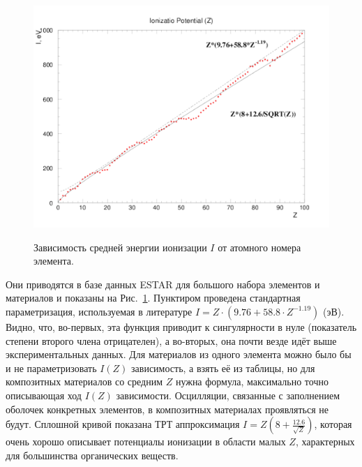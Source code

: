 \documentclass[a4paper,12pt]{article}
\begin{document}
\begin{large}
  \begin{figure}[ht]
    {
       \includegraphics[width=0.99\linewidth]{images/iofz}
    }
    \caption{Зависимость средней энергии ионизации $I$ от атомного номера элемента.}
    \label{fig:iofz}
  \end{figure}
   Они приводятся в базе данных ESTAR для большого набора элементов и материалов и показаны на Рис.~\ref{fig:iofz}.
   Пунктиром проведена стандартная параметризация, используемая в литературе $I=Z\cdot(9.76+58.8\cdot Z^{-1.19})$ (эВ).
   Видно, что, во-первых, эта функция приводит к сингулярности в нуле (показатель степени второго члена отрицателен), а во-вторых, она почти везде идёт выше экспериментальных данных.
   Для материалов из одного элемента можно было бы и не параметризовать $I(Z)$ зависимость, а взять её из таблицы, но для композитных материалов со средним $Z$ нужна формула, максимально  точно описывающая ход $I(Z)$ зависимости.
   Осцилляции, связанные с заполнением оболочек конкретных элементов, в композитных материалах проявляться не будут.
   Сплошной кривой показана ТРТ аппроксимация $I=Z(8+\frac{12.6}{\sqrt{Z}})$, которая очень хорошо описывает потенциалы ионизации в области малых $Z$, характерных для большинства органических веществ.


\end{large}
\end{document}
